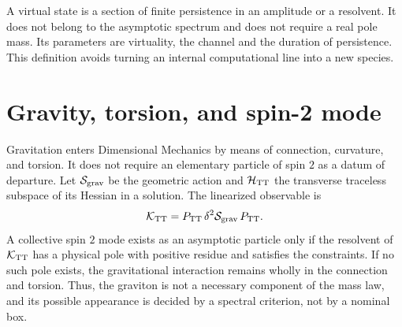 A virtual state is a section of finite persistence in an amplitude or a
resolvent. It does not belong to the asymptotic spectrum and does not require a real pole
mass. Its parameters are virtuality, the channel and the duration of
persistence. This definition avoids turning an internal computational line into
a new species.

\section{Gravity, torsion, and spin-2 mode}

Gravitation enters Dimensional Mechanics by means of connection, curvature, and
torsion. It does not require an elementary particle of spin \(2\) as a datum of
departure. Let \(\mathcal S_{\rm grav}\) be the geometric action and
\(\mathcal H_{\rm TT}\) the transverse traceless subspace of its Hessian
in a solution. The linearized observable is
\[
 \mathcal K_{\rm TT}
 =P_{\rm TT}\,\delta^2\mathcal S_{\rm grav}\,P_{\rm TT}.
\]
A collective spin \(2\) mode exists as an asymptotic particle only
if the resolvent of \(\mathcal K_{\rm TT}\) has a physical pole with positive
residue and satisfies the constraints. If no such pole exists, the gravitational
interaction remains wholly in the connection and torsion. Thus, the
graviton is not a necessary component of the mass law, and its possible appearance
is decided by a spectral criterion, not by a nominal box.
